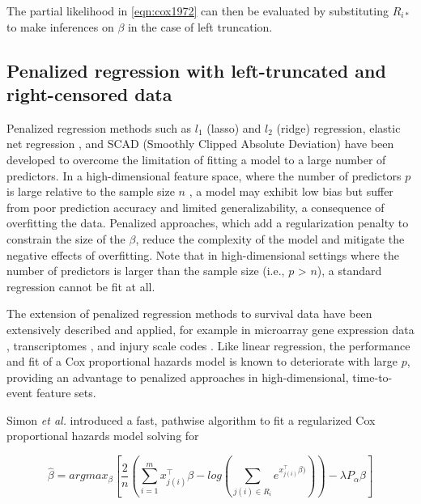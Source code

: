 \documentclass[11pt,final,fleqn]{article}\usepackage[]{graphicx}\usepackage[]{color}
\theoremstyle{plain}
\begin{document}
The partial likelihood in \autoref{eqn:cox1972} can then be evaluated by substituting $R_{i\ast}$ to make inferences on $\beta$ in the case of left truncation. 

\subsection{Penalized regression with left-truncated and right-censored data}
Penalized regression methods such as $l_1$ (lasso) \cite{tibshirani1996regression} and $l_2$ (ridge) \cite{tikhonov1963ridge} regression, elastic net regression \cite{zou2005regularization}, and SCAD (Smoothly Clipped Absolute Deviation) \cite{xie2009scad} have been developed to overcome the limitation of fitting a model to a large number of predictors. In a high-dimensional feature space, where the number of predictors $p$ is large relative to the sample size $n$ , a model may exhibit low bias but suffer from poor prediction accuracy and limited generalizability, a consequence of overfitting the data. Penalized approaches, which add a regularization penalty to constrain the size of the $\beta$, reduce the complexity of the model and mitigate the negative effects of overfitting. Note that in high-dimensional settings where the number of predictors is larger than the sample size (i.e., $p$ > $n$), a standard regression cannot be fit at all.

The extension of penalized regression methods to survival data have been extensively described and applied, for example in microarray gene expression data \cite{gui2005penalized}, transcriptomes \cite{wu2011penalized}, and injury scale codes \cite{mittal2013penalized}. Like linear regression, the performance and fit of a Cox proportional hazards model is known to deteriorate with large $p$, providing an advantage to penalized approaches in high-dimensional, time-to-event feature sets.

Simon \emph{et al.} \cite{simon2011regularization} introduced a fast, pathwise algorithm to fit a regularized Cox proportional hazards model solving for 

\begin{equation} \label{eqn:simon}
\hat{\beta} = argmax_{\beta}  \left[ \frac{2}{n} \left( \sum_{i=1}^m x_{j(i)}^\intercal\beta - log\left(\sum_{j(i)\in R_i}  e^{x_{j(i)}^\intercal\beta)}\right) \right)  - \lambda P_{\alpha}\beta  \right] 
\end{equation}
\end{document}
